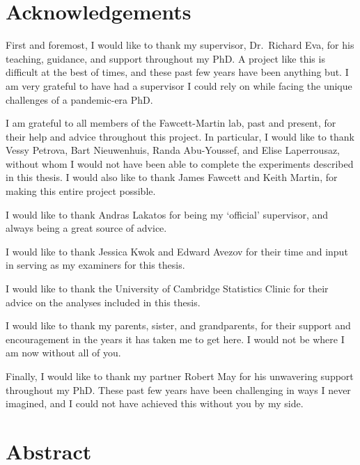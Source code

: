 \documentclass[
  12pt,
  a4paper,
]{book}
\begin{document}
\hypertarget{ACKNOWLEDGEMENTS}{%
\chapter*{Acknowledgements}\label{ACKNOWLEDGEMENTS}}


First and foremost, I would like to thank my supervisor, Dr.~Richard Eva, for his teaching, guidance, and support throughout my PhD. A project like this is difficult at the best of times, and these past few years have been anything but. I am very grateful to have had a supervisor I could rely on while facing the unique challenges of a pandemic-era PhD.

I am grateful to all members of the Fawcett-Martin lab, past and present, for their help and advice throughout this project. In particular, I would like to thank Vessy Petrova, Bart Nieuwenhuis, Randa Abu-Youssef, and Elise Laperrousaz, without whom I would not have been able to complete the experiments described in this thesis. I would also like to thank James Fawcett and Keith Martin, for making this entire project possible.

I would like to thank Andras Lakatos for being my `official' supervisor, and always being a great source of advice.

I would like to thank Jessica Kwok and Edward Avezov for their time and input in serving as my examiners for this thesis.

I would like to thank the University of Cambridge Statistics Clinic for their advice on the analyses included in this thesis.

I would like to thank my parents, sister, and grandparents, for their support and encouragement in the years it has taken me to get here. I would not be where I am now without all of you.

Finally, I would like to thank my partner Robert May for his unwavering support throughout my PhD. These past few years have been challenging in ways I never imagined, and I could not have achieved this without you by my side.

\hypertarget{ABSTRACT}{%
\chapter*{Abstract}\label{ABSTRACT}}

\end{document}
